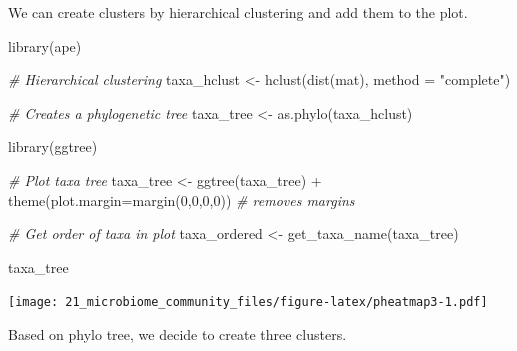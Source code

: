 \documentclass[
]{book}
\newenvironment{Shaded}{\begin{snugshade}}{\end{snugshade}}
\newcommand{\AttributeTok}[1]{\textcolor[rgb]{0.77,0.63,0.00}{#1}}
\newcommand{\CommentTok}[1]{\textcolor[rgb]{0.56,0.35,0.01}{\textit{#1}}}
\newcommand{\ConstantTok}[1]{\textcolor[rgb]{0.00,0.00,0.00}{#1}}
\newcommand{\DecValTok}[1]{\textcolor[rgb]{0.00,0.00,0.81}{#1}}
\newcommand{\FunctionTok}[1]{\textcolor[rgb]{0.00,0.00,0.00}{#1}}
\newcommand{\NormalTok}[1]{#1}
\newcommand{\OtherTok}[1]{\textcolor[rgb]{0.56,0.35,0.01}{#1}}
\newcommand{\SpecialCharTok}[1]{\textcolor[rgb]{0.00,0.00,0.00}{#1}}
\newcommand{\StringTok}[1]{\textcolor[rgb]{0.31,0.60,0.02}{#1}}
\begin{document}
We can create clusters by hierarchical clustering and add them to the plot.

\begin{Shaded}
\begin{Highlighting}[]
\FunctionTok{library}\NormalTok{(ape)}

\CommentTok{\# Hierarchical clustering}
\NormalTok{taxa\_hclust }\OtherTok{\textless{}{-}} \FunctionTok{hclust}\NormalTok{(}\FunctionTok{dist}\NormalTok{(mat), }\AttributeTok{method =} \StringTok{"complete"}\NormalTok{)}

\CommentTok{\# Creates a phylogenetic tree}
\NormalTok{taxa\_tree }\OtherTok{\textless{}{-}} \FunctionTok{as.phylo}\NormalTok{(taxa\_hclust)}
\end{Highlighting}
\end{Shaded}

\begin{Shaded}
\begin{Highlighting}[]
\FunctionTok{library}\NormalTok{(ggtree)}

\CommentTok{\# Plot taxa tree}
\NormalTok{taxa\_tree }\OtherTok{\textless{}{-}} \FunctionTok{ggtree}\NormalTok{(taxa\_tree) }\SpecialCharTok{+} 
  \FunctionTok{theme}\NormalTok{(}\AttributeTok{plot.margin=}\FunctionTok{margin}\NormalTok{(}\DecValTok{0}\NormalTok{,}\DecValTok{0}\NormalTok{,}\DecValTok{0}\NormalTok{,}\DecValTok{0}\NormalTok{)) }\CommentTok{\# removes margins}

\CommentTok{\# Get order of taxa in plot}
\NormalTok{taxa\_ordered }\OtherTok{\textless{}{-}} \FunctionTok{get\_taxa\_name}\NormalTok{(taxa\_tree)}

\NormalTok{taxa\_tree}
\end{Highlighting}
\end{Shaded}

\texttt{[image: 21\_microbiome\_community\_files/figure-latex/pheatmap3-1.pdf]}

Based on phylo tree, we decide to create three clusters.

\begin{Shaded}
\end{Shaded}
\end{document}
